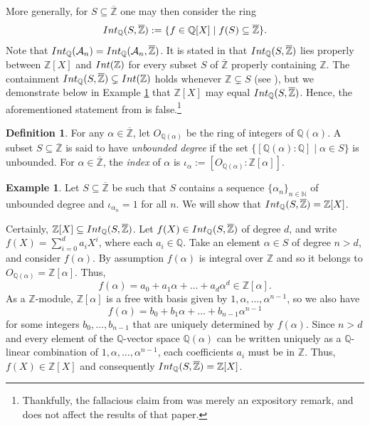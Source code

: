 \documentclass{article}
\theoremstyle{definition}\newtheorem{Def}[equation]{Definition}
\newtheorem{Ex}[equation]{Example}
\theoremstyle{definition}\newtheorem{Ques}[equation]{Question}
\theoremstyle{definition}\newtheorem{Conj}[equation]{Conjecture}
\theoremstyle{definition}\newtheorem{Not}[equation]{Notation}
\newcommand{\N}{\mathbb{N}}
\newcommand{\Q}{\mathbb{Q}}
\newcommand{\oZ}{\overline{\Z}}
\newcommand{\Z}{\mathbb{Z}}
\newcommand{\Int}{\textnormal{Int}}
\newcommand{\IntQ}{\Int_{\Q}}
\newcommand{\An}{\mathcal{A}_n}
\numberwithin{equation}{section}
\begin{document}
More generally, for $S \subseteq \oZ$ one may then consider the ring
\begin{equation*}
\IntQ(S, \oZ):=\{f\in\Q[X] \mid f(S)\subseteq \oZ \}.
\end{equation*}
Note that $\IntQ(\An) = \IntQ(\An,\oZ)$. It is stated in \cite[p.\ 2482]{LopWer} that $\IntQ(S,\oZ)$ lies properly between $\Z[X]$ and $\Int(\Z)$ for every subset $S$ of $\oZ$ properly containing $\Z$. The containment $\IntQ(S,\oZ) \subsetneq \Int(\Z)$ holds whenever $\Z \subsetneq S$ (see \cite{HLP}), but we demonstrate below in Example \ref{Motivating example} that $\Z[X]$ may equal $\IntQ(S,\oZ)$. Hence, the aforementioned statement from \cite[p.\ 2482]{LopWer} is false.\footnote{Thankfully, the fallacious claim from \cite{LopWer} was merely an expository remark, and does not affect the results of that paper.}

\begin{Def} For any $\alpha \in \oZ$, let $O_{\Q(\alpha)}$ be the ring of integers of $\Q(\alpha)$. A subset $S \subseteq \oZ$ is said to have \textit{unbounded degree} if the set $\{[\Q(\alpha):\Q] \mid \alpha \in S\}$ is unbounded. For $\alpha \in \oZ$, the \textit{index} of $\alpha$ is $\iota_\alpha := [O_{\Q(\alpha)} : \Z[\alpha]]$.
\end{Def}


\begin{Ex}\label{Motivating example} Let $S \subseteq \oZ$ be such that $S$ contains a sequence $\{\alpha_n\}_{n \in \N}$ of unbounded degree and $\iota_{\alpha_n}=1$ for all $n$. We will show that $\IntQ(S, \oZ) = \Z[X]$.

Certainly, $\Z[X] \subseteq \IntQ(S, \oZ)$. Let $f(X) \in \IntQ(S, \oZ)$ of degree $d$, and write $f(X) = \sum_{i=0}^d a_i X^i$, where each $a_i \in \Q$. Take an element $\alpha\in S$ of degree $n > d$, and consider $f(\alpha)$. By assumption $f(\alpha)$ is integral over $\Z$ and so it belongs to $O_{\Q(\alpha)}=\Z[\alpha]$. Thus,
\begin{equation*}
f(\alpha)=a_0+a_1\alpha+\ldots+a_d\alpha^d\in\Z[\alpha].
\end{equation*}
As a $\Z$-module, $\Z[\alpha]$ is a free with basis given by $1,\alpha,\ldots,\alpha^{n-1}$, so we also have
\begin{equation*}
f(\alpha)=b_0+b_1\alpha+\ldots+b_{n-1}\alpha^{n-1}
\end{equation*}
for some integers $b_0, \ldots, b_{n-1}$ that are uniquely determined by $f(\alpha)$. Since $n>d$ and every element of the $\Q$-vector space $\Q(\alpha)$ can be written uniquely as a $\Q$-linear combination of $1,\alpha,\ldots,\alpha^{n-1}$, each coefficients $a_i$ must be in $\Z$. Thus, $f(X) \in \Z[X]$ and consequently $\IntQ(S,\oZ) = \Z[X]$.
\end{Ex}
\end{document}
